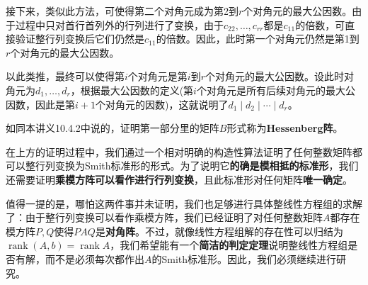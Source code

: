 \documentclass[a4paper,UTF8,fontset=windows,AutoFakeBold]{ctexart}
\DeclareMathOperator{\rank}{rank}
\newcommand*{\note}{\noindent *}
\begin{document}
{\begin{enumerate}
        接下来，类似此方法，可使得第二个对角元成为第2到$r$个对角元的最大公因数。由于过程中只对首行首列外的行列进行了变换，由于$c_{22},\dots,c_{rr}$都是$c_{11}$的倍数，可直接验证整行列变换后它们仍然是$c_{11}$的倍数。因此，此时第一个对角元仍然是第1到$r$个对角元的最大公因数。

        以此类推，最终可以使得第$i$个对角元是第$i$到$r$个对角元的最大公因数。设此时对角元为$d_1,\dots,d_r$，根据最大公因数的定义(第$i$个对角元是所有后续对角元的最大公因数，因此是第$i+1$个对角元的因数)，这就说明了$d_1\mid d_2\mid\cdots\mid d_r$。
    \end{enumerate}
}

\note 如同本讲义10.4.2中说的，证明第一部分里的矩阵$B$形式称为\textbf{Hessenberg阵}。

在上方的证明过程中，我们通过一个相对明确的构造性算法证明了任何整数矩阵都可以整行列变换为Smith标准形的形式。为了说明它\textbf{的确是模相抵的标准形}，我们还需要证明\textbf{乘模方阵可以看作进行行列变换}，且此标准形对任何矩阵\textbf{唯一确定}。

值得一提的是，哪怕这两件事并未证明，我们也足够进行具体整线性方程组的求解了：由于整行列变换可以看作乘模方阵，我们已经证明了对任何整数矩阵$A$都存在模方阵$P,Q$使得$PAQ$是\textbf{对角阵}。不过，就像线性方程组解的存在性可以归结为$\rank(A,b)=\rank A$，我们希望能有一个\textbf{简洁的判定定理}说明整线性方程组是否有解，而不是必须每次都作出$A$的Smith标准形。因此，我们必须继续进行研究。
\end{document}
